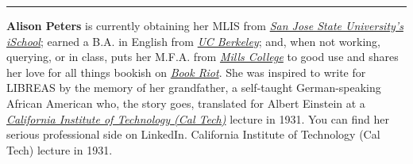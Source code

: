 \begin{center}\rule{0.5\linewidth}{\linethickness}\end{center}

\textbf{Alison Peters} is currently obtaining her MLIS from
\href{http://ischool.sjsu.edu/}{\emph{San Jose State University's
iSchool}}; earned a B.A. in English from
\href{http://berkeley.edu/}{\emph{UC Berkeley}}; and, when not working,
querying, or in class, puts her M.F.A. from
\href{http://www.mills.edu/}{\emph{Mills College}} to good use and
shares her love for all things bookish on
\href{http://bookriot.com/}{\emph{Book Riot}}. She was inspired to write
for LIBREAS by the memory of her grandfather, a self-taught
German-speaking African American who, the story goes, translated for
Albert Einstein at a \href{http://www.caltech.edu/}{\emph{California
Institute of Technology (Cal Tech)}} lecture in 1931. You can find her
serious professional side on LinkedIn. California Institute of
Technology (Cal Tech) lecture in 1931.
